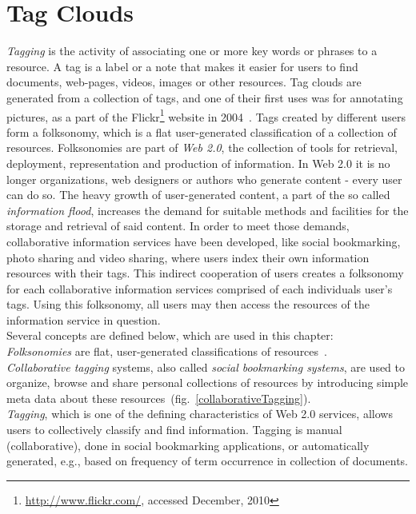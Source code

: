 \chapter{Tag Clouds}
\label{sec:tagclouds}

\textit{Tagging} is the activity of associating one or more key words or phrases to a resource. A tag is a label or a note that makes it easier for users to find documents, web-pages, videos, images or other resources. Tag clouds are generated from a collection of tags, and one of their first uses was for annotating pictures, as a part of the Flickr\footnote{\url{http://www.flickr.com/}, accessed December, 2010} website in 2004~\cite{folksonomiesWeb2.0_2009}. Tags created by different users form a folksonomy, which is a flat user-generated classification of a collection of resources. Folksonomies are part of \textit{Web 2.0}, the collection of tools for retrieval, deployment, representation and production of information. In Web 2.0 it is no longer organizations, web designers or authors who generate content - every user can do so. The heavy growth of user-generated content, a part of the so called \textit{information flood}, increases the demand for suitable methods and facilities for the storage and retrieval of said content. In order to meet those demands, collaborative information services have been developed, like social bookmarking, photo sharing and video sharing, where users index their own information resources with their tags. This indirect cooperation of users creates a folksonomy for each collaborative information services comprised of each individuals user's tags. Using this folksonomy, all users may then access the resources of the information service in question. \\ 

Several concepts are defined below, which are used in this chapter:\\

\textit{Folksonomies} are flat, user-generated classifications of resources~\cite{folksonomiesWeb2.0_2009}. \\

\textit{Collaborative tagging} systems, also called \textit{social bookmarking systems}, are used to organize, browse and share personal collections of resources by introducing simple meta data about these resources~(fig.~\ref{collaborativeTagging}). \\

\textit{Tagging}, which is one of the defining characteristics of Web 2.0 services, allows users to collectively classify and find information. Tagging is manual (collaborative), done in social bookmarking applications, or automatically generated, e.g., based on frequency of term occurrence in collection of documents.\\

